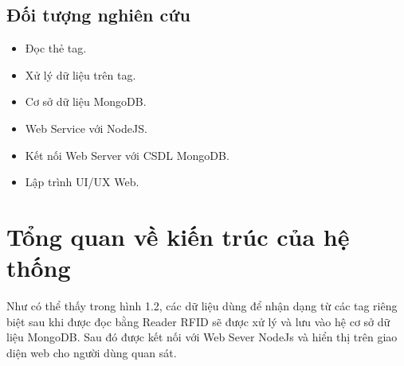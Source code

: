\subsection{Đối tượng nghiên cứu}
\begin{itemize}
	\item Đọc thẻ tag.
	\item Xử lý dữ liệu trên tag.
	\item Cơ sở dữ liệu MongoDB.
	\item Web Service với NodeJS.
	\item Kết nối Web Server với CSDL MongoDB.
	\item Lập trình UI/UX Web.
\end{itemize}
\section{Tổng quan về kiến trúc của hệ thống}
\label{ref{fig1_1}}
Như có thể thấy trong hình 1.2, các dữ liệu dùng để nhận dạng từ các tag riêng biệt sau khi được đọc bằng Reader RFID sẽ được xử lý và lưu vào hệ cơ sở dữ liệu MongoDB. Sau đó được kết nối với Web Sever NodeJs và hiển thị trên giao diện web cho người dùng quan sát.
